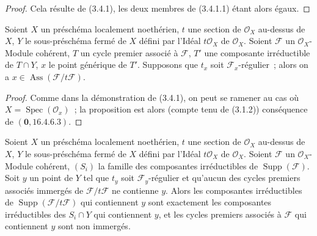\begin{proof}
Cela résulte de (3.4.1), les deux membres de (3.4.1.1) étant alors égaux.
\end{proof}

\begin{proposition}[3.4.3]
\label{IV.2.3.4.3-fr}
Soient $X$ un préschéma localement noethérien, $t$ une section de
$\mathcal O_X$ au-dessus de $X$, $Y$ le sous-préschéma fermé de $X$ défini par
l'Idéal $t\mathcal O_X$ de $\mathcal O_X$. Soient $\mathcal F$ un
$\mathcal O_X$-Module cohérent, $T$ un cycle premier associé à $\mathcal F$,
$T'$ une composante irréductible de $T\cap Y$, $x$ le point générique de
$T'$. Supposons que $t_x$ soit $\mathcal F_x$-régulier~; alors on a
$x\in\operatorname{Ass}(\mathcal F/t\mathcal F)$.
\end{proposition}

\begin{proof}
Comme dans la démonstration de (3.4.1), on peut se ramener au cas où
$X=\operatorname{Spec}(\mathcal O_x)$~; la proposition est alors (compte tenu
de (3.1.2)) conséquence de $(\mathbf{0},16.4.6.3)$.
\end{proof}

\begin{proposition}[3.4.4]
\label{IV.2.3.4.4-fr}
Soient $X$ un préschéma localement noethérien, $t$ une section de
$\mathcal O_X$ au-dessus de $X$, $Y$ le sous-préschéma fermé de $X$ défini par
l'Idéal $t\mathcal O_X$ de $\mathcal O_X$. Soient $\mathcal F$ un
$\mathcal O_X$-Module cohérent, $(S_i)$ la famille des composantes
irréductibles de $\operatorname{Supp}(\mathcal F)$. Soit $y$ un point de $Y$
tel que $t_y$ soit $\mathcal F_y$-régulier et qu'aucun des cycles premiers
associés immergés de $\mathcal F/t\mathcal F$ ne contienne $y$. Alors les
composantes irréductibles de $\operatorname{Supp}(\mathcal F/t\mathcal F)$ qui
contiennent $y$ sont exactement les composantes irréductibles des $S_i\cap Y$
qui contiennent $y$, et les cycles premiers associés à $\mathcal F$ qui
contiennent $y$ sont non immergés.
\end{proposition}

